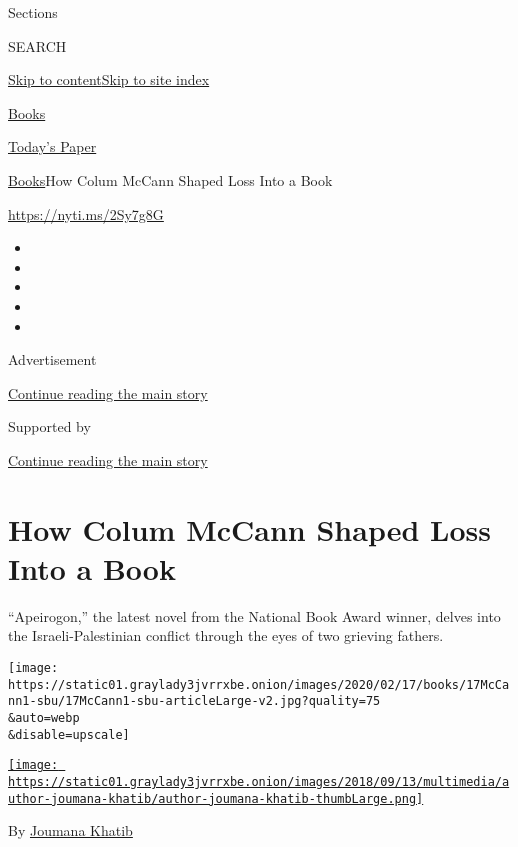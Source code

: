 Sections

SEARCH

\protect\hyperlink{site-content}{Skip to
content}\protect\hyperlink{site-index}{Skip to site index}

\href{https://www.nytimes3xbfgragh.onion/section/books}{Books}

\href{https://myaccount.nytimes3xbfgragh.onion/auth/login?response_type=cookie\&client_id=vi}{}

\href{https://www.nytimes3xbfgragh.onion/section/todayspaper}{Today's
Paper}

\href{/section/books}{Books}\textbar{}How Colum McCann Shaped Loss Into
a Book

\url{https://nyti.ms/2Sy7g8G}

\begin{itemize}
\item
\item
\item
\item
\item
\end{itemize}

Advertisement

\protect\hyperlink{after-top}{Continue reading the main story}

Supported by

\protect\hyperlink{after-sponsor}{Continue reading the main story}

\hypertarget{how-colum-mccann-shaped-loss-into-a-book}{%
\section{How Colum McCann Shaped Loss Into a
Book}\label{how-colum-mccann-shaped-loss-into-a-book}}

``Apeirogon,'' the latest novel from the National Book Award winner,
delves into the Israeli-Palestinian conflict through the eyes of two
grieving fathers.

\texttt{[image: https://static01.graylady3jvrrxbe.onion/images/2020/02/17/books/17McCann1-sbu/17McCann1-sbu-articleLarge-v2.jpg?quality=75\\\&auto=webp\\\&disable=upscale]}

\href{https://nytimes3xbfgragh.onion/by/joumana-khatib}{\texttt{[image: https://static01.graylady3jvrrxbe.onion/images/2018/09/13/multimedia/author-joumana-khatib/author-joumana-khatib-thumbLarge.png]}}

By \href{https://nytimes3xbfgragh.onion/by/joumana-khatib}{Joumana
Khatib}

